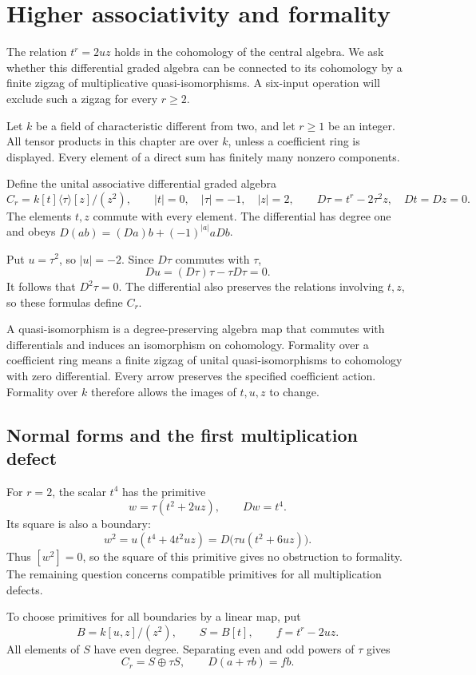 \chapter{Higher associativity and formality}
\label{chap:higher-associativity}

The relation $t^r=2uz$ holds in the cohomology of the central algebra.
We ask whether this differential graded algebra can be connected to
its cohomology by a finite zigzag of multiplicative quasi-isomorphisms.
A six-input operation will exclude such a zigzag for every $r\geq2$.

Let $k$ be a field of characteristic different from two, and let $r\geq1$ be an integer.
All tensor products in this chapter are over $k$, unless a coefficient
ring is displayed. Every element of a direct sum has finitely many
nonzero components.

Define the unital associative differential graded
algebra
\[
 C_r=k[t]\langle\tau\rangle[z]/(z^2),\qquad
 |t|=0,\quad |\tau|=-1,\quad |z|=2,
 \qquad D\tau=t^r-2\tau^2z,\quad Dt=Dz=0.
\]
The elements $t,z$ commute with every element. The differential has
degree one and obeys $D(ab)=(Da)b+(-1)^{|a|}aDb$.

Put $u=\tau^2$, so $|u|=-2$. Since $D\tau$ commutes with $\tau$,
\[
 Du=(D\tau)\tau-\tau D\tau=0.
\]
It follows that $D^2\tau=0$. The differential also preserves the
relations involving $t,z$, so these formulas define $C_r$.

A quasi-isomorphism is a degree-preserving algebra map that commutes
with differentials and induces an isomorphism on cohomology.
Formality over a coefficient ring means a finite zigzag of unital
quasi-isomorphisms to cohomology with zero differential. Every arrow
preserves the specified coefficient action. Formality over $k$ therefore
allows the images of $t,u,z$ to change.

\section{Normal forms and the first multiplication defect}
\label{sec:ha-normal-forms}

For $r=2$, the scalar $t^4$ has the primitive
\[
 w=\tau(t^2+2uz),\qquad Dw=t^4.
\]
Its square is also a boundary:
\[
 w^2=u(t^4+4t^2uz)
     =D\bigl(\tau u(t^2+6uz)\bigr).
\]
Thus $[w^2]=0$, so the square of this primitive gives no obstruction to formality.
The remaining question concerns compatible primitives for all
multiplication defects.

To choose primitives for all boundaries by a linear map, put
\[
 B=k[u,z]/(z^2),\qquad S=B[t],\qquad f=t^r-2uz.
\]
All elements of $S$ have even degree. Separating even and odd powers
of $\tau$ gives
\begin{equation}\label{eq:ha-two-summands}
 C_r=S\oplus\tau S,\qquad D(a+\tau b)=fb.
\end{equation}

